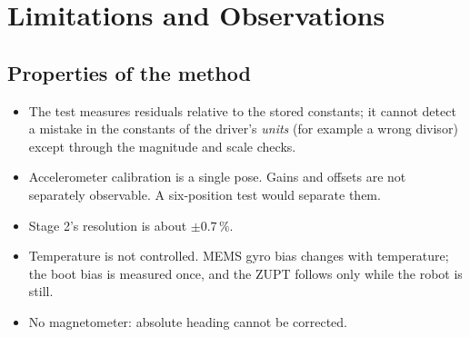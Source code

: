 \documentclass[11pt,a4paper]{report}
\begin{document}
\chapter[Limitations]{Limitations and Observations}\label{ch:limits}

\section{Properties of the method}
\begin{itemize}[noitemsep]
  \item The test measures residuals relative to the stored constants; it cannot detect a mistake in the constants of the driver's \emph{units} (for example a wrong divisor) except through the magnitude and scale checks.
  \item Accelerometer calibration is a single pose. Gains and offsets are not separately observable. A six-position test would separate them.
  \item Stage 2's resolution is about $\pm0.7\,\%$.
  \item Temperature is not controlled. MEMS gyro bias changes with temperature; the boot bias is measured once, and the ZUPT follows only while the robot is still.
  \item No magnetometer: absolute heading cannot be corrected.
\end{itemize}
\end{document}
